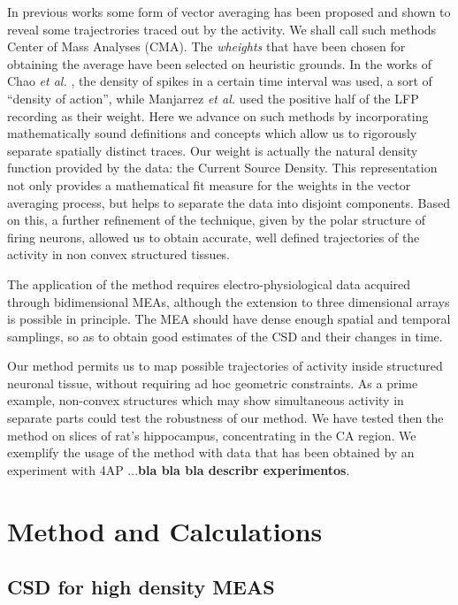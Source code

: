 \documentclass{article}
\begin{document}
In previous works some form of vector averaging has been proposed and shown to reveal some trajectrories traced out by the activity. We shall call such methods Center of Mass Analyses (CMA).  The \emph{wheights} that have been chosen for obtaining the average have been selected on heuristic grounds. In the works of Chao \emph{et al.} \cite{Chao05, Chao07}, the density of spikes in a certain time interval was used, a sort of ``density of action'', while Manjarrez \emph{et al.} \cite{Manjarrez07, Manjarrez09} used the positive half of the LFP recording as their weight. 
Here we advance on such methods by incorporating mathematically sound definitions and concepts which allow us to rigorously separate spatially distinct traces. Our weight is actually the natural density function provided by the data: the Current Source Density. This representation not only provides a mathematical fit measure for the weights in the vector averaging process, but helps to separate the data into disjoint components. Based on this, a further refinement of the technique, given by the polar structure of firing neurons, allowed us to obtain accurate, well defined trajectories of the activity in non convex structured tissues. 

The application of the method requires electro-physiological data acquired through bidimensional MEAs, although the extension to three dimensional arrays is possible in principle. The MEA should have dense enough spatial and temporal samplings, so as to obtain good estimates of the CSD and their changes in time.

Our method permits us to map possible trajectories of activity inside structured neuronal tissue, without requiring ad hoc geometric constraints. As a prime example, non-convex structures which may show simultaneous activity in separate parts could test the robustness of our method. We have tested then the method on slices of rat's hippocampus, concentrating in the CA region. We exemplify the usage of the method with data that has been obtained by an experiment with 4AP ...\textbf{bla bla bla describr experimentos}.




\section{Method and Calculations}


\subsection{CSD for high density MEAS}
\end{document}
